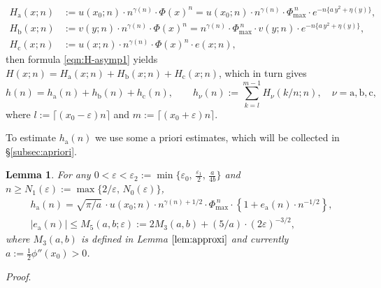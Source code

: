 \documentclass[a4paper,12pt]{article}
\theoremstyle{plain}
\newtheorem{lemma}[theorem]{Lemma}
\def\ra{\mathrm{a}}
\def\rb{\mathrm{b}}
\def\rc{\mathrm{c}}
\def\ve{\varepsilon}
\def\Phim{\Phi_{\scriptstyle \mathrm{max}}}
\begin{document}
\begin{subequations}
\begin{align}
H_{\ra}(x; n) &:= u(x_0; n) \cdot n^{\gamma(n)} \cdot \Phi( x )^n 
= u( x_0; n ) \cdot n^{\gamma(n)} \cdot \Phim^{\, n} \cdot 
e^{-n \{ a \, y^2 + \eta( y ) \}}, 
\label{eqn:Ha} \\
H_{\rb}(x; n) &:= v( y; n ) \cdot n^{\gamma(n)} \cdot \Phi( x )^n  =  
n^{\gamma(n)} \cdot \Phim^{\, n} \cdot v( y; n ) \cdot 
e^{-n \{ a \, y^2 + \eta( y ) \}}, \label{eqn:Hb} \\
H_{\rc}(x; n) &:= u(x; n) \cdot n^{\gamma(n)} \cdot \Phi(x)^n \cdot e(x; n),      
\label{eqn:Hc} 
\end{align}
\end{subequations}   
then formula \eqref{eqn:H-asymp1} yields 
$H(x; n) = H_{\ra}(x; n) + H_{\rb}(x; n) + H_{\rc}(x; n)$, which in turn gives 
\[
h(n) = h_{\ra}(n) + h_{\rb}(n) + h_{\rc}(n), \qquad 
h_{\nu}(n) := \sum_{k = l}^{m-1} H_{\nu}(k/n; n), \quad 
\nu = \ra, \rb, \rc,  
\]  
where  $l := \lceil (x_0-\ve) n \rceil$ and $m := \lceil (x_0 + \ve) n \rceil$. 
\par
To estimate $h_{\ra}(n)$ we use some a priori estimates, which will be collected  
in \S \ref{subsec:apriori}.    
\begin{lemma} \label{lem:ha}  
For any $0 < \ve < \ve_2 := \min\{ \ve_0, \, \frac{\ve_1}{2}, \, \frac{a}{4 b} \}$ 
and $n \ge N_1(\ve) := \max\{ 2/\ve, \, N_0(\ve) \}$,   
\begin{subequations} \label{eqn:ha}
\begin{gather} 
h_{\ra}(n) = \sqrt{\pi/a} \, \cdot u(x_0; n) \cdot 
n^{\gamma(n) +1/2} \cdot \Phim^{\, n} \cdot \left\{ 1 + e_{\ra}(n) \cdot n^{-1/2} \right \}, 
\label{eqn:ha1} \\[2mm]
|e_{\ra}(n)| \le M_5(a, b; \ve) := 2 M_3(a, b) + (5/a) \cdot (2 \ve)^{-3/2},   \label{eqn:ha2}
\end{gather}
\end{subequations}
where $M_3(a, b)$ is defined in Lemma $\ref{lem:approxi}$ and currently  
$a := \frac{1}{2} \phi''(x_0) > 0$.   
\end{lemma}
{\it Proof}. 
\end{document}
